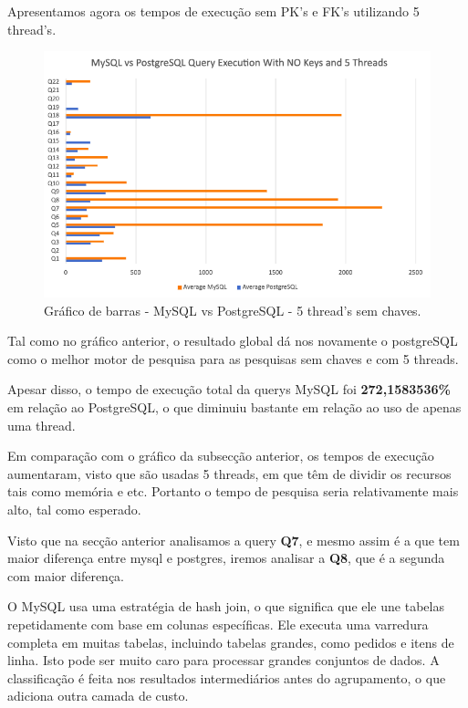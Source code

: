 \documentclass{article}
\begin{document}
Apresentamos agora os tempos de execução sem PK's e FK's utilizando 5 thread's.
\begin{figure}[H]
  \centering
  \includegraphics[width=\textwidth]{Graphs/mysqlvspostgres_withoutkeys_fivethreads.png}
  \caption{Gráfico de barras - MySQL vs PostgreSQL - 5 thread's sem chaves.}
  \label{fig:PKCreation2}
\end{figure}

Tal como no gráfico anterior, o resultado global dá nos novamente o postgreSQL como o melhor motor de pesquisa para as pesquisas sem chaves e com 5 threads.

Apesar disso, o tempo de execução total da querys MySQL foi \textbf{272,1583536\%} em relação ao PostgreSQL, o que diminuiu bastante em relação ao uso de apenas uma thread.

Em comparação com o gráfico da subsecção anterior, os tempos de execução aumentaram,
visto que são usadas 5 threads, em que têm de dividir os recursos tais como memória e etc. Portanto
o tempo de pesquisa seria relativamente mais alto, tal como esperado.

Visto que na secção anterior analisamos a query \textbf{Q7}, e mesmo assim é a que tem maior diferença entre mysql e postgres, iremos analisar a \textbf{Q8}, que é a segunda com maior diferença.

O MySQL usa uma estratégia de hash join, o que significa que ele une tabelas repetidamente com base em colunas específicas.
Ele executa uma varredura completa em muitas tabelas, incluindo tabelas grandes, como pedidos e itens de linha.
Isto pode ser muito caro para processar grandes conjuntos de dados.
A classificação é feita nos resultados intermediários antes do agrupamento, o que adiciona outra camada de custo.
\end{document}
